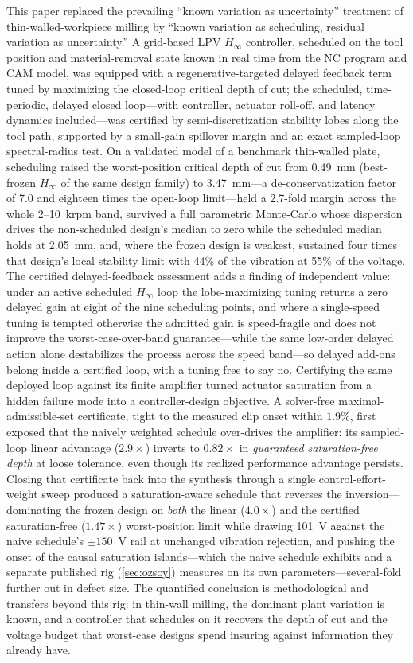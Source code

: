 \documentclass[preprint,12pt]{elsarticle}
\newcommand{\hinf}{H_\infty}
\begin{document}
This paper replaced the prevailing ``known variation as uncertainty''
treatment of thin-walled-workpiece milling by ``known variation as
scheduling, residual variation as uncertainty.'' A grid-based LPV
$\hinf$ controller, scheduled on the tool position and material-removal
state known in real time from the NC program and CAM model, was
equipped with a regenerative-targeted delayed feedback term tuned by
maximizing the closed-loop critical depth of cut; the scheduled,
time-periodic, delayed closed loop---with controller, actuator
roll-off, and latency dynamics included---was certified by
semi-discretization stability lobes along the tool path, supported by a
small-gain spillover margin and an exact sampled-loop spectral-radius
test. On a validated model of a benchmark thin-walled plate, scheduling
raised the worst-position critical depth of cut from 0.49~mm
(best-frozen $\hinf$ of the same design family) to 3.47~mm---a
de-conservatization factor of 7.0 and eighteen times the open-loop
limit---held a 2.7-fold margin across the whole 2--10~krpm band,
survived a full parametric Monte-Carlo whose dispersion drives the
non-scheduled design's median to zero while the scheduled median holds
at 2.05~mm, and, where the frozen design is weakest, sustained four
times that design's local stability limit with 44\% of the vibration at
55\% of the voltage. The certified delayed-feedback assessment adds a finding
of independent value: under an active scheduled $\hinf$ loop the
lobe-maximizing tuning returns a zero delayed gain at eight of the nine
scheduling points, and where a single-speed tuning is tempted otherwise
the admitted gain is speed-fragile and does not improve the
worst-case-over-band guarantee---while the same low-order delayed action
alone destabilizes the process across the speed band---so delayed
add-ons belong inside a certified loop, with a tuning free to say no. Certifying the same
deployed loop against its finite amplifier turned actuator saturation
from a hidden failure mode into a controller-design objective. A
solver-free maximal-admissible-set certificate, tight to the measured
clip onset within $1.9\%$, first exposed that the naively weighted
schedule over-drives the amplifier: its sampled-loop linear advantage
($2.9\times$) inverts to $0.82\times$ in \emph{guaranteed
saturation-free depth} at loose tolerance, even though its realized
performance advantage persists. Closing that certificate back into the
synthesis through a single control-effort-weight sweep produced a
saturation-aware schedule that reverses the inversion---dominating the
frozen design on \emph{both} the linear ($4.0\times$) and the certified
saturation-free ($1.47\times$) worst-position limit while drawing 101~V
against the naive schedule's $\pm 150$~V rail at unchanged vibration
rejection, and pushing the onset of the causal saturation
islands---which the naive schedule exhibits and a separate published rig
(\ref{sec:ozsoy}) measures on its own parameters---several-fold further
out in defect size. The quantified conclusion is methodological and
transfers beyond this rig: in
thin-wall milling, the dominant plant variation is known, and a
controller that schedules on it recovers the depth of cut and the
voltage budget that worst-case designs spend insuring against
information they already have.
\end{document}
